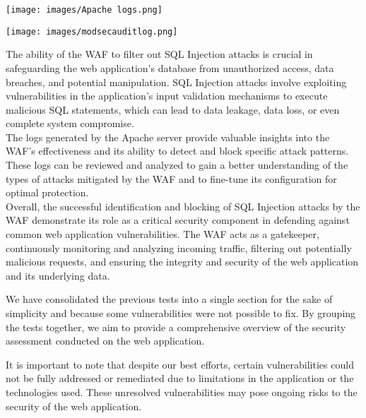 \documentclass[12pt]{article}
\begin{document}
\begin{center}
    \texttt{[image: images/Apache logs.png]}
\end{center}

\begin{center}
    \texttt{[image: images/modsecauditlog.png]}
\end{center}

The ability of the WAF to filter out SQL Injection attacks is crucial in safeguarding the web application's database from unauthorized access, data breaches, and potential manipulation. SQL Injection attacks involve exploiting vulnerabilities in the application's input validation mechanisms to execute malicious SQL statements, which can lead to data leakage, data loss, or even complete system compromise.\\

The logs generated by the Apache server provide valuable insights into the WAF's effectiveness and its ability to detect and block specific attack patterns. These logs can be reviewed and analyzed to gain a better understanding of the types of attacks mitigated by the WAF and to fine-tune its configuration for optimal protection.\\

Overall, the successful identification and blocking of SQL Injection attacks by the WAF demonstrate its role as a critical security component in defending against common web application vulnerabilities. The WAF acts as a gatekeeper, continuously monitoring and analyzing incoming traffic, filtering out potentially malicious requests, and ensuring the integrity and security of the web application and its underlying data.\\

\newpage

We have consolidated the previous tests into a single section for the sake of simplicity and because some vulnerabilities were not possible to fix. By grouping the tests together, we aim to provide a comprehensive overview of the security assessment conducted on the web application.

It is important to note that despite our best efforts, certain vulnerabilities could not be fully addressed or remediated due to limitations in the application or the technologies used. These unresolved vulnerabilities may pose ongoing risks to the security of the web application.
\end{document}

